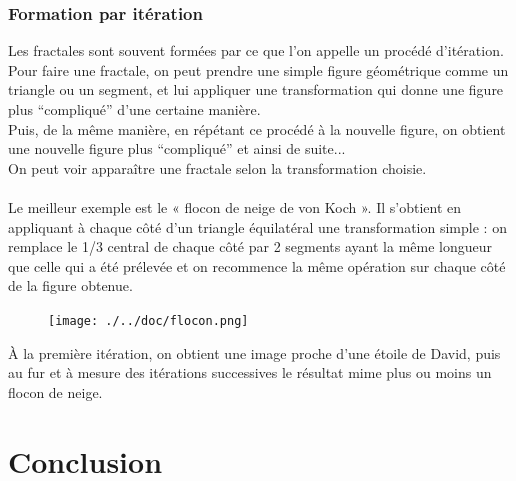 \documentclass[a4paper]{article}
\begin{document}
\subsubsection{Formation par itération}
Les fractales sont souvent formées par ce que l'on appelle un procédé d'itération.\\
Pour faire une fractale, on peut prendre une simple figure géométrique comme un triangle ou un segment, et lui appliquer une transformation qui donne une figure plus ``compliqué'' d'une certaine manière.\\
Puis, de la même manière, en répétant ce procédé à la nouvelle figure, on obtient une nouvelle figure plus ``compliqué'' et ainsi de suite... \\
On peut voir apparaître une fractale selon la transformation choisie.\\\\
Le meilleur exemple est le « flocon de neige de von Koch ».
Il s'obtient en appliquant à chaque côté d'un triangle équilatéral une transformation simple : on remplace le 1/3 central de chaque côté par 2 segments ayant la même longueur que celle qui a été prélevée et on recommence la même opération sur chaque côté de la figure obtenue. 

\begin{figure}[H]
\begin{center}
\texttt{[image: ./../doc/flocon.png]}
\end{center}
\end{figure}

À la première itération, on obtient une image proche d'une étoile de David, puis au fur et à mesure des itérations successives le résultat mime plus ou moins un flocon de neige.
\newpage

\section{Conclusion}
\end{document}
